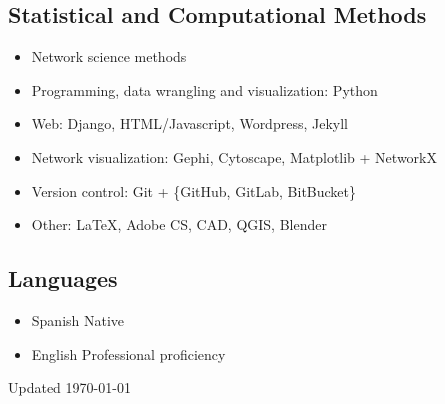 \documentclass{academiccv}
\begin{document}
\subsection*{Statistical and Computational Methods}
\begin{itemize}
	\item Network science methods
	\item Programming, data wrangling and visualization: Python
	\item Web: Django, HTML/Javascript, Wordpress, Jekyll
	\item Network visualization: Gephi, Cytoscape, Matplotlib + NetworkX
	\item Version control: Git +  \{GitHub, GitLab, BitBucket\}
	\item Other: \LaTeX, Adobe CS, CAD, QGIS, Blender
\end{itemize}

\subsection*{Languages}
\begin{itemize}
	\item Spanish \tab Native
	\item English \tab Professional proficiency
\end{itemize}

\begin{center}
\vspace{6em}
Updated \monthyeardate\today
\end{center}
\end{document}
